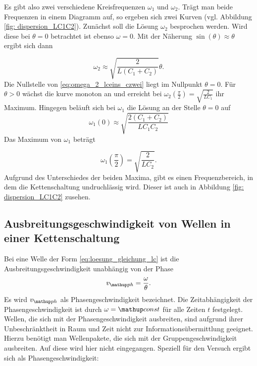 Es gibt also zwei verschiedene Kreisfrequenzen $\omega_1$ und $\omega_2$.
Trägt man beide Frequenzen in einem Diagramm auf, so ergeben sich %
zwei Kurven (vgl. Abbildung \ref{fig: dispersion_LC1C2}).
Zunächst soll die Lösung $\omega_2$ besprochen werden.
Wird diese bei $\theta=0$ betrachtet ist ebenso $\omega=0$.
Mit der Näherung $\sin(\theta)\approx\theta$ ergibt sich dann

\begin{equation}
\label{eq:omega_2_lceins_czwei}
\omega_2\approx\sqrt{\frac{2}{L\left(C_1+C_2\right)}}\theta.
\end{equation}
Die Nullstelle von \eqref{eq:omega_2_lceins_czwei} liegt im Nullpunkt $\theta=0$.
Für $\theta>0$ wächst die kurve monoton an und erreicht bei $\omega_2(\frac{\pi}{2})=\sqrt{\frac{2}{LC_1}}$
ihr Maximum. \newline
Hingegen beläuft sich bei $\omega_1$ die Lösung an der Stelle $\theta=0$ auf
\begin{equation*}
\omega_1(0)\approx\sqrt{\frac{2(C_1+C_2)}{LC_1C_2}}
\end{equation*}
Das Maximum von $\omega_1$ beträgt

\begin{equation}
\label{eq:max_omega_1_ceins_czwei}
\omega_1(\frac{\pi}{2})=\sqrt{\frac{2}{LC_2}}.
\end{equation}
Aufgrund des Unterschiedes der beiden Maxima, gibt es einen Frequenzbereich, in dem %
die Kettenschaltung undruchlässig wird. Dieser ist auch in Abbildung \ref{fig: dispersion_LC1C2} %
zusehen.

\subsection{Ausbreitungsgeschwindigkeit von Wellen in einer Kettenschaltung}
Bei eine Welle der Form \eqref{eq:loesung_gleichung_lc} %
ist die Ausbreitungsgeschwindigkeit unabhängig von der Phase %
\begin{equation*}
v\ua{ph}=\frac{\omega}{\theta}.
\end{equation*}
Es wird $v\ua{ph}$ als Phasengeschwindigkeit bezeichnet.
Die Zeitabhängigkeit der Phasengeschwindigkeit ist durch $\omega=\map{const}$
für alle Zeiten $t$ festgelegt. Wellen, die sich mit der Phasengeschwindigkeit
ausbreiten, sind aufgrund ihrer Unbeschränktheit in Raum und Zeit nicht zur %
Informationsübermittlung geeignet. Hierzu benötigt man Wellenpakete, die sich
mit der Gruppengeschwindigkeit ausbreiten. Auf diese wird hier nicht eingegangen. %
Speziell für den Versuch ergibt sich als Phasengeschwindigkeit:

